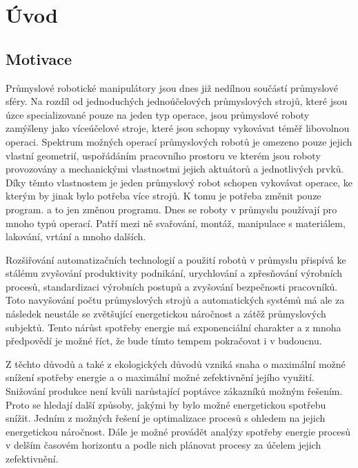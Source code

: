 

\chapter{Úvod}

\section{Motivace}

Průmyslové robotické manipulátory jsou dnes již nedílnou součástí průmyslové sféry. Na rozdíl od jednoduchých jednoúčelových průmyslových strojů, které jsou úzce specializované pouze na jeden typ operace, jsou průmyslové roboty zamýšleny jako víceúčelové stroje, které jsou schopny vykovávat téměř libovolnou operaci. Spektrum možných operací průmyslových robotů je omezeno pouze jejich vlastní geometrií, uspořádáním pracovního prostoru ve kterém jsou roboty provozovány a mechanickými vlastnostmi jejich aktuátorů a jednotlivých prvků. Díky těmto vlastnostem je jeden průmyslový robot schopen vykovávat operace, ke kterým by jinak bylo potřeba více strojů. K tomu je potřeba změnit pouze program. a to jen změnou programu. Dnes se roboty v průmyslu používají pro mnoho typů operací. Patří mezi ně svařování, montáž, manipulace s materiálem, lakování, vrtání a mnoho dalších.

Rozšiřování automatizačních technologií a použití robotů v průmyslu přispívá ke stálému zvyšování produktivity podnikání, urychlování a zpřesňování výrobních procesů, standardizaci výrobních postupů a zvyšování bezpečnosti pracovníků. Toto navyšování počtu průmyslových strojů a automatických systémů má ale za následek neustále se zvětšující energetickou náročnost a zátěž průmyslových subjektů. Tento nárůst spotřeby energie má exponenciální charakter a z mnoha předpovědí \cite{energy_url} je možné říct, že bude tímto tempem pokračovat i v budoucnu.

Z těchto důvodů a také z ekologických důvodů vzniká snaha o maximální možné snížení spotřeby energie a o maximální možné zefektivnění jejího využití. Snižování produkce není kvůli narůstající poptávce zákazníků možným řešením. Proto se hledají další způsoby, jakými by bylo možné energetickou spotřebu snížit. Jedním z možných řešení je optimalizace procesů s ohledem na jejich energetickou náročnost. Dále je možné provádět analýzy spotřeby energie procesů v delším časovém horizontu a podle nich plánovat procesy za účelem jejich zefektivnění.

